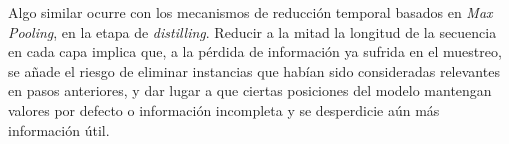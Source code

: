 Algo similar ocurre con los mecanismos de reducción temporal basados en \textit{Max Pooling}, en la etapa de \textit{distilling}. Reducir a la mitad la longitud de la secuencia en cada capa implica que, a la pérdida de información ya sufrida en el muestreo, se añade el riesgo de eliminar instancias que habían sido consideradas relevantes en pasos anteriores, y dar lugar a que ciertas posiciones del modelo mantengan valores por defecto o información incompleta y se desperdicie aún más información útil.